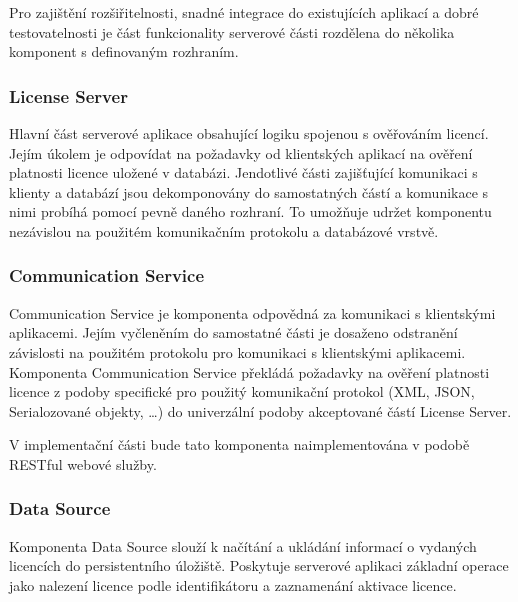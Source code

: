 Pro zajištění rozšiřitelnosti, snadné integrace do existujících aplikací a dobré
testovatelnosti je část funkcionality serverové části rozdělena do několika
komponent s definovaným rozhraním.

\subsubsection*{License Server}

Hlavní část serverové aplikace obsahující logiku spojenou s ověřováním
licencí. Jejím úkolem je odpovídat na požadavky od klientských aplikací na
ověření platnosti licence uložené v databázi. Jendotlivé části zajišťující
komunikaci s klienty a databází jsou dekomponovány do samostatných částí a
komunikace s nimi probíhá pomocí pevně daného rozhraní. To umožňuje udržet
komponentu nezávislou na použitém komunikačním protokolu a databázové vrstvě.

\subsubsection*{Communication Service}

Communication Service je komponenta odpovědná za komunikaci s klientskými
aplikacemi. Jejím vyčleněním do samostatné části je dosaženo odstranění
závislosti na použitém protokolu pro komunikaci s klientskými aplikacemi.
Komponenta Communication Service překládá požadavky na ověření platnosti licence
z podoby specifické pro použitý komunikační protokol (XML, JSON, Serialozované
objekty, \ldots) do univerzální podoby akceptované částí License Server.

V implementační části bude tato komponenta naimplementována v podobě
RESTful\cite{rest} webové služby.

\subsubsection*{Data Source}

Komponenta Data Source slouží k načítání a ukládání informací o vydaných
licencích do persistentního úložiště. Poskytuje serverové aplikaci základní operace jako
nalezení licence podle identifikátoru a zaznamenání aktivace licence.  

